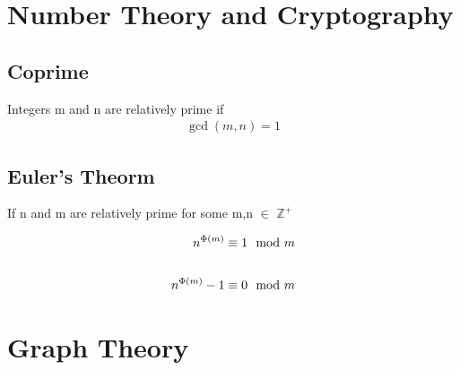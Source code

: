 \documentclass[12pt]{article}
\begin{document}
%
%
%
%
%
%
\pagebreak
\section{Number Theory and Cryptography}
\setcounter{equation}{0}


\subsection{Coprime}
Integers m and n are relatively prime if 
\begin{align}
\gcd (m,n) = 1
\end{align}

\subsection{Euler's Theorm}
If 
n
and
m
are
relatively
prime 
for
some
m,n $\in$ $\mathbb{Z}^+$

\begin{subequations}
\begin{align}
n^{\Phi(m)}\equiv 1\mod{m}\\
\intertext{ }
n^{\Phi(m)} - 1\equiv 0\mod{m}
\end{align}
\end{subequations}

%
%
%
%
%
%
\pagebreak
\section{Graph Theory}
\setcounter{equation}{0}
\end{document}
